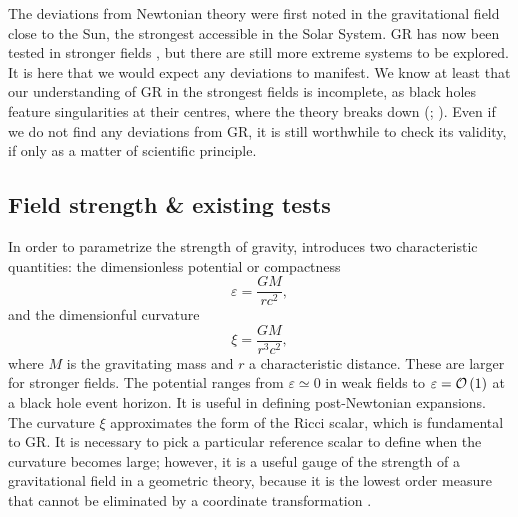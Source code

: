 The deviations from Newtonian theory were first noted in the gravitational field close to the Sun, the strongest accessible in the Solar System. GR has now been tested in stronger fields \citep{Will2006}, but there are still more extreme systems to be explored. It is here that we would expect any deviations to manifest. We know at least that our understanding of GR in the strongest fields is incomplete, as black holes feature singularities at their centres, where the theory breaks down (\citealt[section 34.6]{Misner1973}; \citealt[chapter 9]{Wald1984}). Even if we do not find any deviations from GR, it is still worthwhile to check its validity, if only as a matter of scientific principle.

\subsection{Field strength \& existing tests}

In order to parametrize the strength of gravity, \citet{Psaltis2008a} introduces two characteristic quantities: the dimensionless potential or compactness \citep{Yunes2013}
\begin{equation}
\varepsilon = \frac{GM}{rc^2},
\end{equation}
and the dimensionful curvature
\begin{equation}
\xi = \frac{GM}{r^3c^2},
\end{equation}
where $M$ is the gravitating mass and $r$ a characteristic distance. These are larger for stronger fields. The potential ranges from $\varepsilon \simeq 0$ in weak fields to $\varepsilon = \mathcal{O}\left({1}\right)$ at a black hole event horizon. It is useful in defining post-Newtonian expansions. The curvature $\xi$ approximates the form of the Ricci scalar, which is fundamental to GR. It is necessary to pick a particular reference scalar to define when the curvature becomes large; however, it is a useful gauge of the strength of a gravitational field in a geometric theory, because it is the lowest order measure that cannot be eliminated by a coordinate transformation \citep[chapter 7]{Hobson2006}.

